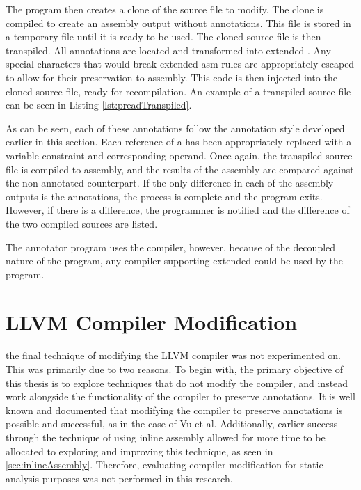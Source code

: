The program then creates a clone of the source file to modify. The clone is compiled to create an assembly output without annotations. This file is stored in a temporary file until it is ready to be used. The cloned source file is then transpiled. All annotations are located and transformed into extended . Any special characters that would break extended asm rules are appropriately escaped to allow for their preservation to assembly. This code is then injected into the cloned source file, ready for recompilation. An example of a transpiled source file can be seen in Listing \ref{lst:preadTranspiled}.



As can be seen, each of these annotations follow the annotation style developed earlier in this section. Each reference of a  has been appropriately replaced with a variable constraint and corresponding operand. Once again, the transpiled source file is compiled to assembly, and the results of the assembly are compared against the non-annotated counterpart. If the only difference in each of the assembly outputs is the annotations, the process is complete and the program exits. However, if there is a difference, the programmer is notified and the difference of the two compiled sources are listed.

The annotator program uses the  compiler, however, because of the decoupled nature of the program, any compiler supporting extended  could be used by the program. 

\section{LLVM Compiler Modification}
the final technique of modifying the LLVM compiler was not experimented on. This was primarily due to two reasons. To begin with, the primary objective of this thesis is to explore techniques that do not modify the compiler, and instead work alongside the functionality of the compiler to preserve annotations. It is well known and documented that modifying the compiler to preserve annotations is possible and successful, as in the case of Vu et al. \cite{vu2020secure} Additionally, earlier success through the technique of using inline assembly allowed for more time to be allocated to exploring and improving this technique, as seen in \ref{sec:inlineAssembly}. Therefore, evaluating compiler modification for static analysis purposes was not performed in this research.
